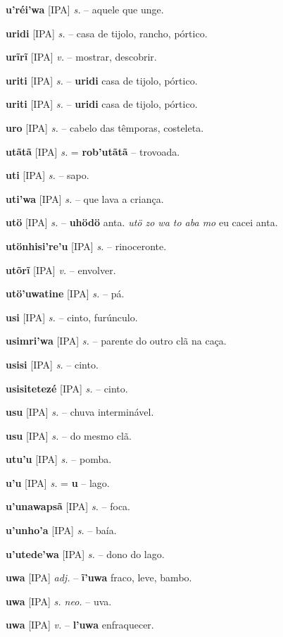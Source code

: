 \textbf{u'réi'wa} [IPA] \textit{s.} -- aquele que unge.

\textbf{uridi} [IPA] \textit{s.} -- casa de tijolo, rancho, pórtico.

\textbf{urĩrĩ} [IPA] \textit{v.} -- mostrar, descobrir.

\textbf{uriti} [IPA] \textit{s.} -- \textbf{uridi} casa de tijolo, pórtico.

\textbf{uriti} [IPA] \textit{s.} -- \textbf{uridi} casa de tijolo, pórtico.

\textbf{uro} [IPA] \textit{s.} -- cabelo das têmporas, costeleta.

\textbf{utãtã} [IPA] \textit{s.} = \textbf{rob'utãtã} -- trovoada.

\textbf{uti} [IPA] \textit{s.} -- sapo.

\textbf{uti'wa} [IPA] \textit{s.} -- que lava a criança.

\textbf{utö} [IPA] \textit{s.} -- \textbf{uhödö} anta. \textit{utö zo wa to aba mo} eu cacei anta.

\textbf{utönhisi're'u} [IPA] \textit{s.} -- rinoceronte.

\textbf{utõrĩ} [IPA] \textit{v.} -- envolver.

\textbf{utö'uwatine} [IPA] \textit{s.} -- pá.

\textbf{usi} [IPA] \textit{s.} -- cinto, furúnculo.

\textbf{usimri'wa} [IPA] \textit{s.} -- parente do outro clã na caça.

\textbf{usisi} [IPA] \textit{s.} -- cinto.

\textbf{usisitetezé} [IPA] \textit{s.} -- cinto.

\textbf{usu} [IPA] \textit{s.} -- chuva interminável.

\textbf{usu} [IPA] \textit{s.} -- do mesmo clã.

\textbf{utu'u} [IPA] \textit{s.} -- pomba.

\textbf{u'u} [IPA] \textit{s.} = \textbf{u} -- lago.

\textbf{u'unawapsã} [IPA] \textit{s.} -- foca.

\textbf{u'unho'a} [IPA] \textit{s.} -- baía.

\textbf{u'utede'wa} [IPA] \textit{s.} -- dono do lago.

\textbf{uwa} [IPA] \textit{adj.} -- \textbf{ĩ'uwa} fraco, leve, bambo.

\textbf{uwa} [IPA] \textit{s. neo.} -- uva.

\textbf{uwa} [IPA] \textit{v.} -- \textbf{l'uwa} enfraquecer.

